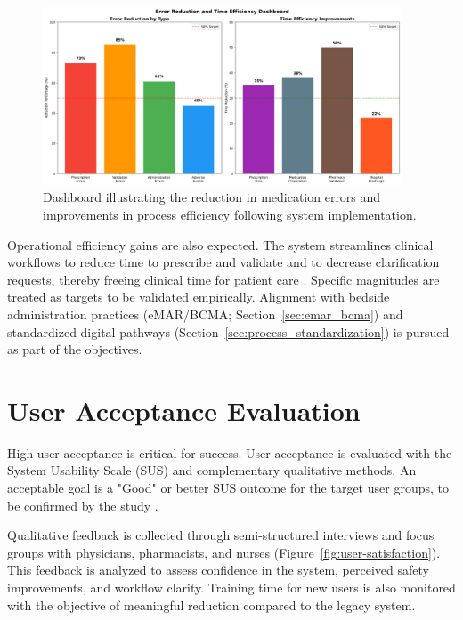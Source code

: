\begin{figure}[htbp]
    \centering
    \includegraphics[width=0.95\textwidth]{images/generated/error_reduction_dashboard.png}
    \caption{Dashboard illustrating the reduction in medication errors and improvements in process efficiency following system implementation.}
    \label{fig:error-reduction}
\end{figure}

Operational efficiency gains are also expected. The system streamlines clinical workflows to reduce time to prescribe and validate and to decrease clarification requests, thereby freeing clinical time for patient care \cite{austin2018}. Specific magnitudes are treated as targets to be validated empirically. Alignment with bedside administration practices (eMAR/BCMA; Section~\ref{sec:emar_bcma}) and standardized digital pathways (Section~\ref{sec:process_standardization}) is pursued as part of the objectives.

\section{User Acceptance Evaluation}

High user acceptance is critical for success. User acceptance is evaluated with the System Usability Scale (SUS) and complementary qualitative methods. An acceptable goal is a "Good" or better SUS outcome for the target user groups, to be confirmed by the study \cite{lewis2018}.

Qualitative feedback is collected through semi-structured interviews and focus groups with physicians, pharmacists, and nurses (Figure~\ref{fig:user-satisfaction}). This feedback is analyzed to assess confidence in the system, perceived safety improvements, and workflow clarity. Training time for new users is also monitored with the objective of meaningful reduction compared to the legacy system.

